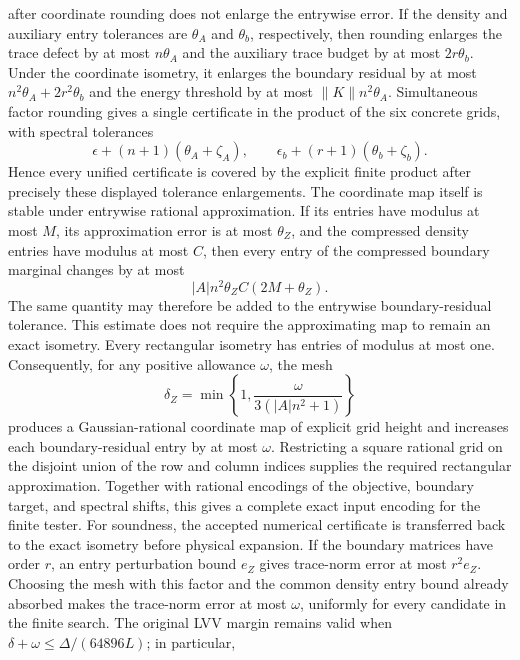 \begin{lemma}
    after coordinate rounding does not enlarge the entrywise error.  If the
    density and auxiliary entry tolerances are $\theta_A$ and $\theta_b$,
    respectively, then rounding enlarges the trace defect by at most
    $n\theta_A$ and the auxiliary trace budget by at most $2r\theta_b$.
    Under the coordinate isometry, it enlarges the boundary residual by at
    most $n^2\theta_A+2r^2\theta_b$ and the energy threshold by at most
    $\lVert K\rVert n^2\theta_A$.  Simultaneous factor rounding gives a
    single certificate in the product of the six concrete grids, with
    spectral tolerances
    \[
        \epsilon+(n+1)(\theta_A+\zeta_A),\qquad
        \epsilon_b+(r+1)(\theta_b+\zeta_b).
    \]
    Hence every unified certificate is covered by the explicit finite product
    after precisely these displayed tolerance enlargements.
    The coordinate map itself is stable under entrywise rational
    approximation.  If its entries have modulus at most $M$, its approximation
    error is at most $\theta_Z$, and the compressed density entries have
    modulus at most $C$, then every entry of the compressed boundary marginal
    changes by at most
    \[
        |A|n^2\theta_Z C(2M+\theta_Z).
    \]
    The same quantity may therefore be added to the entrywise boundary-residual
    tolerance.  This estimate does not require the approximating map to remain
    an exact isometry.
    Every rectangular isometry has entries of modulus at most one.  Consequently,
    for any positive allowance $\omega$, the mesh
    \[
        \delta_Z=\min\left\{1,
        \frac{\omega}{3(|A|n^2+1)}\right\}
    \]
    produces a Gaussian-rational coordinate map of explicit grid height and
    increases each boundary-residual entry by at most $\omega$.  Restricting a
    square rational grid on the disjoint union of the row and column indices
    supplies the required rectangular approximation.  Together with rational
    encodings of the objective, boundary target, and spectral shifts, this gives
    a complete exact input encoding for the finite tester.
    For soundness, the accepted numerical certificate is transferred back to
    the exact isometry before physical expansion.  If the boundary matrices
    have order $r$, an entry perturbation bound $e_Z$ gives trace-norm error at
    most $r^2e_Z$.  Choosing the mesh with this factor and the common density
    entry bound already absorbed makes the trace-norm error at most $\omega$,
    uniformly for every candidate in the finite search.  The original LVV
    margin remains valid when $\delta+\omega\le\Delta/(64896L)$; in particular,

\end{lemma}
